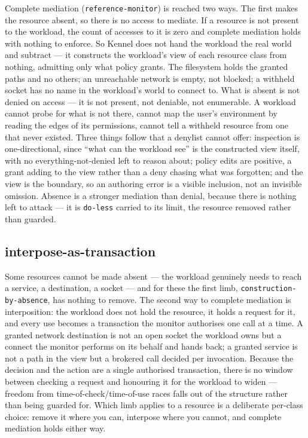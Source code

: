 Complete mediation (\texttt{reference-monitor}) is reached two ways. The
first makes the resource absent, so there is no access to mediate. If a
resource is not present to the workload, the count of accesses to it is
zero and complete mediation holds with nothing to enforce. So Kennel
does not hand the workload the real world and subtract --- it constructs
the workload's view of each resource class from nothing, admitting only
what policy grants. The filesystem holds the granted paths and no
others; an unreachable network is empty, not blocked; a withheld socket
has no name in the workload's world to connect to. What is absent is not
denied on access --- it is not present, not deniable, not enumerable. A
workload cannot probe for what is not there, cannot map the user's
environment by reading the edges of its permissions, cannot tell a
withheld resource from one that never existed. Three things follow that
a denylist cannot offer: inspection is one-directional, since ``what can
the workload see'' is the constructed view itself, with no
everything-not-denied left to reason about; policy edits are positive, a
grant adding to the view rather than a deny chasing what was forgotten;
and the view is the boundary, so an authoring error is a visible
inclusion, not an invisible omission. Absence is a stronger mediation
than denial, because there is nothing left to attack --- it is
\texttt{do-less} carried to its limit, the resource removed rather than
guarded.

\hypertarget{interpose-as-transaction}{%
\subsection{\texorpdfstring{interpose-as-transaction}{interpose-as-transaction}}\label{interpose-as-transaction}}

Some resources cannot be made absent --- the workload genuinely needs to
reach a service, a destination, a socket --- and for these the first
limb, \texttt{construction-by-absence}, has nothing to remove. The
second way to complete mediation is interposition: the workload does not
hold the resource, it holds a request for it, and every use becomes a
transaction the monitor authorises one call at a time. A granted network
destination is not an open socket the workload owns but a connect the
monitor performs on its behalf and hands back; a granted service is not
a path in the view but a brokered call decided per invocation. Because
the decision and the action are a single authorised transaction, there
is no window between checking a request and honouring it for the
workload to widen --- freedom from time-of-check/time-of-use races falls
out of the structure rather than being guarded for. Which limb applies
to a resource is a deliberate per-class choice: remove it where you can,
interpose where you cannot, and complete mediation holds either way.

